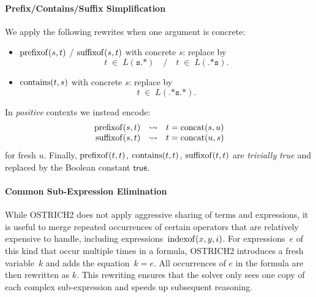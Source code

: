 \paragraph*{Prefix/Contains/Suffix Simplification}
We apply the following rewrites when one argument is concrete:
\begin{itemize}
	\item $\operatorname{prefixof}(s,t)$ / $\operatorname{suffixof}(s,t)$ with concrete $s$:
	replace by
	\[
	t \;\in\; L(\texttt{s.*}) \quad/\quad t \;\in\; L(\texttt{.*s}).
	\]
	\item $\operatorname{contains}(t,s)$ with concrete $s$:
	replace by
	\[
	t \;\in\; L(\texttt{.*s.*}).
	\]
\end{itemize}
In \emph{positive} contexts we instead encode:
\[
    \begin{array}{rcl}
        \operatorname{prefixof}(s,t)&\rightsquigarrow&t = \operatorname{concat}(s, u) \\
        \operatorname{suffixof}(s,t)&\rightsquigarrow&t = \operatorname{concat}(u, s)
    \end{array}
\]
for fresh $u$.
Finally, $\operatorname{prefixof}(t,t)$, $\operatorname{contains}(t,t)$, $\operatorname{suffixof}(t,t)$
are \emph{trivially true} and replaced by the Boolean constant $\mathsf{true}$.

\paragraph*{Common Sub-Expression Elimination}

While OSTRICH2 does not apply aggressive sharing of terms and expressions, it is useful to merge repeated occurrences of certain operators that are relatively expensive to handle, including expressions~$\operatorname{indexof}(x,y,i)$. For expressions~$e$ of this kind that occur multiple times in a formula, OSTRICH2 introduces a fresh variable~$k$ and adds the equation~$k = e$.
All occurrences of $e$ in the formula are then rewritten as $k$.
This rewriting ensures that the solver only sees one copy of each complex sub-expression and speeds up subsequent reasoning.


